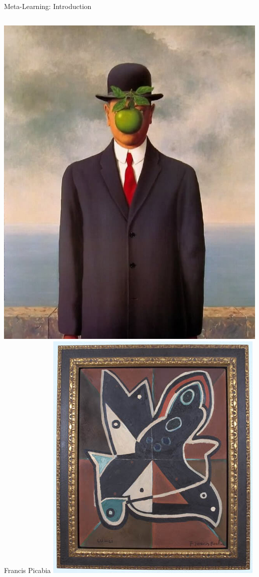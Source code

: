 \begin{frame}[c]{Meta-Learning: Introduction}
\begin{columns}
	\includegraphics[width=1.0\textwidth]{images/meta_learning/magritte_2.jpg}
	Francis Picabia
	\centering
	\includegraphics[width=.8\textwidth]{images/meta_learning/picabia_3.jpg}

\end{columns}
\end{frame}
